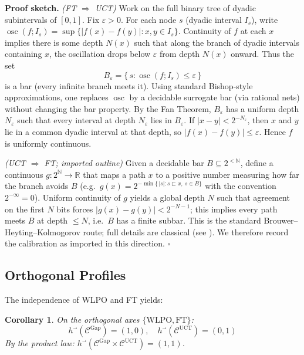 \documentclass[11pt]{article}
\newtheorem{corollary}[theorem]{Corollary}
\newenvironment{proof}[1][Proof]{\noindent\textbf{#1.}\hspace{0.5em}}{\hfill$\square$\par}
\newcommand{\N}{\mathbb{N}}
\newcommand{\R}{\mathbb{R}}
\newcommand{\WLPO}{\mathrm{WLPO}}
\newcommand{\FT}{\mathrm{FT}}
\newcommand{\UCT}{\mathrm{UCT}}
\begin{document}
\begin{proof}[Proof sketch]
\emph{(FT $\Rightarrow$ UCT)} Work on the full binary tree of dyadic subintervals of $[0,1]$.
Fix $\varepsilon>0$. For each node $s$ (dyadic interval $I_s$), write
$\operatorname{osc}(f;I_s)=\sup\{|f(x)-f(y)|:x,y\in I_s\}$.
Continuity of $f$ at each $x$ implies there is some depth $N(x)$ such that along the branch of
dyadic intervals containing $x$, the oscillation drops below $\varepsilon$ from depth $N(x)$ onward.
Thus the set
\[
B_\varepsilon=\{\,s:\operatorname{osc}(f;I_s)\le\varepsilon\,\}
\]
is a bar (every infinite branch meets it). Using standard Bishop-style approximations, one replaces
$\operatorname{osc}$ by a decidable surrogate bar (via rational nets) without changing the bar
property. By the Fan Theorem, $B_\varepsilon$ has a uniform depth $N_\varepsilon$ such that every
interval at depth $N_\varepsilon$ lies in $B_\varepsilon$. If $|x-y|<2^{-N_\varepsilon}$, then $x$
and $y$ lie in a common dyadic interval at that depth, so $|f(x)-f(y)|\le\varepsilon$. Hence $f$ is
uniformly continuous.

\smallskip
\emph{(UCT $\Rightarrow$ FT; imported outline)} Given a decidable bar $B\subseteq 2^{<\N}$, define a
continuous $g:2^\N\to\R$ that maps a path $x$ to a positive number measuring how far the branch
avoids $B$ (e.g.\ $g(x)=2^{-\min\{\,|s|:s\sqsubset x,\ s\in B\}}$ with the convention $2^{-\infty}=0$).
Uniform continuity of $g$ yields a global depth $N$ such that agreement on the first $N$ bits forces
$|g(x)-g(y)|<2^{-N-1}$; this implies every path meets $B$ at depth $\le N$, i.e.\ $B$ has a finite
subbar. This is the standard Brouwer--Heyting--Kolmogorov route; full details are classical (see
\cite{bridges2007}). We therefore record the calibration as imported in this direction.
\end{proof}

\subsection{Orthogonal Profiles}

The independence of WLPO and FT yields:

\begin{corollary}
On the orthogonal axes $\{\WLPO, \FT\}$:
\[
h^{\vec{}}(\mathcal{C}^{\text{Gap}}) = (1, 0), \quad h^{\vec{}}(\mathcal{C}^{\UCT}) = (0, 1)
\]
By the product law: $h^{\vec{}}(\mathcal{C}^{\text{Gap}} \times \mathcal{C}^{\UCT}) = (1, 1)$.
\end{corollary}
\end{document}
